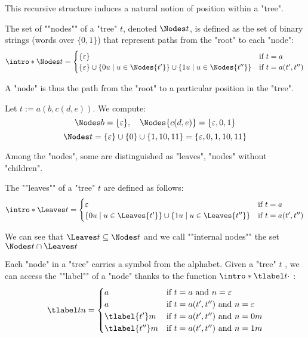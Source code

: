 \documentclass[a4paper,UKenglish,cleveref, autoref, thm-restate]{lipics-v2021}
\begin{document}
This recursive structure induces a natural notion of position within a "tree".

\begin{definition}
	\AP The set of ""nodes"" of a "tree" $t$, denoted $\Nodes t$, is defined as the set of binary strings (words over $\{0,1\}$)
	that represent paths from the "root" to each "node":
	\[
		\intro* \Nodes t =
		\begin{cases}
			\{\varepsilon\}                      & \text{if } t = a          \\
			\{\varepsilon\} \cup \setdef{0u}{u \in \Nodes {t'}}
			\cup \setdef{1u}{u \in \Nodes {t''}} & \text{if } t = a(t', t'')
		\end{cases}
	\]

	A "node" is thus the path from the "root" to a particular position in the "tree".
\end{definition}

\begin{example}
	Let $t := a(b, c(d, e))$. We compute:
	\[
		\Nodes b = \{\varepsilon\}, \quad \Nodes{c(d, e)} = \{\varepsilon, 0, 1\}
	\]
	\[
		\Nodes t = \{\varepsilon\} \cup \{0\} \cup \{1, 10, 11\} = \{\varepsilon, 0, 1, 10, 11\}
	\]
\end{example}


Among the "nodes", some are distinguished as "leaves", "nodes" without "children".
\begin{definition}
	\AP The ""leaves"" of a "tree" $t$ are defined as follows:
	\[
		\intro* \Leaves t = \begin{cases}
			\varepsilon                              & \text{if } t = a         \\
			\setdef {0u} {u \in \Leaves {t'}}
			\cup \setdef {1u} {u \in \Leaves {t''} } & \text{if } t = a(t',t'')
		\end{cases}
	\]

	\AP We can see that $\Leaves t \subseteq \Nodes t $ and we call ""internal nodes"" the set $\Nodes t \cap \Leaves t$
\end{definition}


Each "node" in a "tree" carries a symbol from the alphabet.
\AP Given a "tree" $t$ , we can access the ""label"" of a "node"
thanks to the function $\intro* \tlabel t {\cdot}$ :
\[
	\tlabel t n =   \begin{cases}
		a               & \text{if } t = a \text{ and } n = \varepsilon         \\
		a               & \text{if } t = a(t',t'') \text{ and } n = \varepsilon \\
		\tlabel {t'} m  & \text{if } t = a(t',t'') \text{ and } n = 0m          \\
		\tlabel {t''} m & \text{if } t = a(t',t'') \text{ and } n = 1m
	\end{cases}
\]
\end{document}

